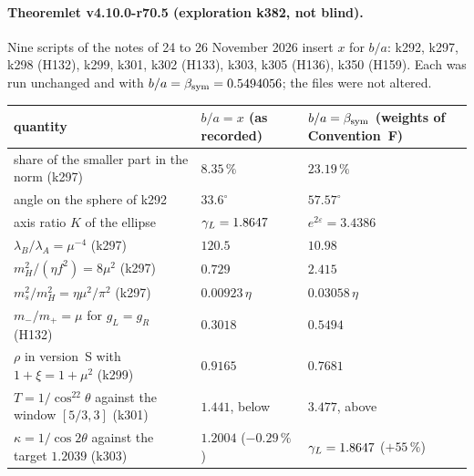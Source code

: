 \paragraph{Theoremlet v4.10.0-r70.5 (exploration k382, not blind).}
Nine scripts of the notes of 24 to 26 November 2026 insert \(x\) for \(b/a\): k292, k297, k298 (H132), k299, k301, k302 (H133), k303, k305
(H136), k350 (H159).  Each was run unchanged and with \(b/a=\beta_{\mathrm{sym}}=0.5494056\); the files were not altered.
\begin{center}
\small
\begin{tabular}{@{}>{\raggedright\arraybackslash}p{}>{\raggedright\arraybackslash}p{}>{\raggedright\arraybackslash}p{}@{}}
\toprule
quantity & \(b/a=x\) (as recorded) & \(b/a=\beta_{\mathrm{sym}}\) (weights of Convention~F)\\
\midrule
share of the smaller part in the norm (k297) & \(8.35\,\%\) & \(23.19\,\%\)\\
angle on the sphere of k292 & \(33.6^\circ\) & \(57.57^\circ\)\\
axis ratio \(K\) of the ellipse & \(\gamma_L=1.8647\) & \(e^{2\varepsilon}=3.4386\)\\
\(\lambda_B/\lambda_A=\mu^{-4}\) (k297) & \(120.5\) & \(10.98\)\\
\(m_H^2/(\eta f^2)=8\mu^2\) (k297) & \(0.729\) & \(2.415\)\\
\(m_s^2/m_H^2=\eta\mu^2/\pi^2\) (k297) & \(0.00923\,\eta\) & \(0.03058\,\eta\)\\
\(m_-/m_+=\mu\) for \(g_L=g_R\) (H132) & \(0.3018\) & \(0.5494\)\\
\(\rho\) in version~S with \(1+\xi=1+\mu^2\) (k299) & \(0.9165\) & \(0.7681\)\\
\(T=1/\cos^22\theta\) against the window \([5/3,3]\) (k301) & \(1.441\), below & \(3.477\), above\\
\(\kappa=1/\cos2\theta\) against the target \(1.2039\) (k303) & \(1.2004\) (\(-0.29\,\%\)) & \(\gamma_L=1.8647\) (\(+55\,\%\))\\
\bottomrule
\end{tabular}
\end{center}
